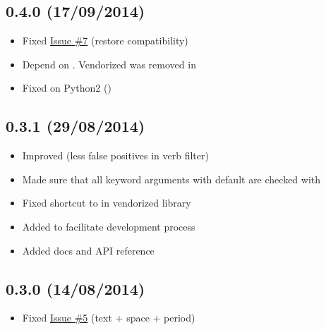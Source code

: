 \documentclass[letterpaper,10pt,english]{sphinxmanual}
\begin{document}
\subsection{0.4.0 (17/09/2014)}
\label{changelog:id2}\begin{itemize}
\item {} 
Fixed \href{https://github.com/markuskiller/textblob-de/issues/7}{Issue \#7} (restore  compatibility)

\item {} 
Depend on . Vendorized  was removed in 

\item {} 
Fixed  on Python2 ()

\end{itemize}


\subsection{0.3.1 (29/08/2014)}
\label{changelog:id3}\begin{itemize}
\item {} 
Improved  (less false positives in verb filter)

\item {} 
Made sure that all keyword arguments with default  are checked with 

\item {} 
Fixed shortcut to  in vendorized library

\item {} 
Added  to facilitate development process

\item {} 
Added docs and API reference

\end{itemize}


\subsection{0.3.0 (14/08/2014)}
\label{changelog:id4}\begin{itemize}
\item {} 
Fixed \href{https://github.com/markuskiller/textblob-de/issues/5}{Issue \#5} (text + space + period)

\end{itemize}
\end{document}
